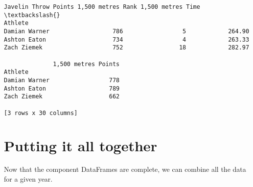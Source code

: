 \documentclass[11pt]{article}
\begin{document}
\begin{tcolorbox}[breakable, size=fbox, boxrule=.5pt, pad at break*=1mm, opacityfill=0]
\begin{Verbatim}[commandchars=\\\{\}]
              Javelin Throw Points 1,500 metres Rank 1,500 metres Time  \textbackslash{}
Athlete
Damian Warner                  786                 5            264.90
Ashton Eaton                   734                 4            263.33
Zach Ziemek                    752                18            282.97

              1,500 metres Points
Athlete
Damian Warner                 778
Ashton Eaton                  789
Zach Ziemek                   662

[3 rows x 30 columns]
\end{Verbatim}
\end{tcolorbox}
        
    \hypertarget{putting-it-all-together}{%
\section*{Putting it all together}\label{putting-it-all-together}}

    Now that the component DataFrames are complete, we can combine all the
data for a given year.
\end{document}
